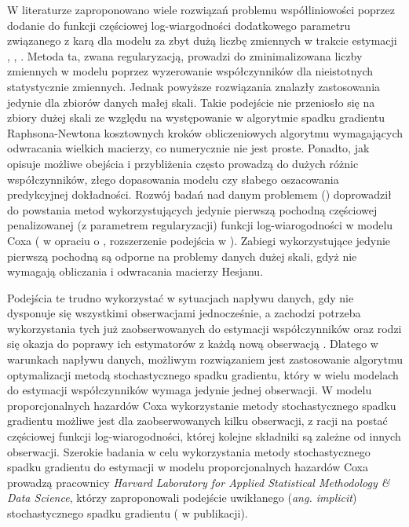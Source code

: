 W literaturze zaproponowano wiele rozwiązań problemu współliniowości poprzez dodanie do funkcji częściowej log-wiargodności dodatkowego parametru związanego z karą dla modelu za zbyt dużą liczbę zmiennych w trakcie estymacji \cite{parkm}, \cite{sohn}, \cite{goemann}. Metoda ta, zwana regularyzacją, prowadzi do zminimalizowana liczby zmiennych w modelu poprzez wyzerowanie współczynników dla nieistotnych statystycznie zmiennych. Jednak powyższe rozwiązania znalazły zastosowania jedynie dla zbiorów danych małej skali. Takie podejście nie przeniosło się na zbiory dużej skali ze względu na występowanie w algorytmie spadku gradientu Raphsona-Newtona kosztownych kroków obliczeniowych algorytmu wymagających odwracania wielkich macierzy, co numerycznie nie jest proste. Ponadto, jak opisuje \cite{mital} możliwe obejścia i przybliżenia często prowadzą do dużych różnic współczynników, złego dopasowania modelu czy słabego oszacowania predykcyjnej dokładności. Rozwój badań nad danym problemem (\cite{KIMKIM}) doprowadził do powstania metod wykorzystujących jedynie pierwszą pochodną częściowej penalizowanej (z parametrem regularyzacji) funkcji log-wiarogodności w modelu Coxa (\cite{sohn} w opraciu o \cite{KIM}, rozszerzenie podejścia w \cite{mital}). Zabiegi wykorzystujące jedynie pierwszą pochodną są odporne na problemy danych dużej skali, gdyż nie wymagają obliczania i odwracania macierzy Hesjanu. 

Podejścia te trudno wykorzystać w sytuacjach napływu danych, gdy nie dysponuje się wszystkimi obserwacjami jednocześnie, a zachodzi potrzeba wykorzystania tych już zaobserwowanych do estymacji współczynników oraz rodzi się okazja do poprawy ich estymatorów z każdą nową obserwacją \cite{bottDOD}. Dlatego w warunkach napływu danych, możliwym rozwiązaniem jest zastosowanie algorytmu optymalizacji metodą stochastycznego spadku gradientu, który w wielu modelach do estymacji współczynników wymaga jedynie jednej obserwacji. W modelu proporcjonalnych hazardów Coxa wykorzystanie metody stochastycznego spadku gradientu możliwe jest dla zaobserwowanych kilku obserwacji, z racji na postać częściowej funkcji log-wiarogodności, której kolejne składniki są zależne od innych obserwacji. Szerokie badania w celu wykorzystania metody stochastycznego spadku gradientu do estymacji w modelu proporcjonalnych hazardów Coxa prowadzą pracownicy \textit{Harvard Laboratory for Applied Statistical Methodology \& Data Science}, którzy zaproponowali podejście uwikłanego (\textit{ang. implicit}) stochastycznego spadku gradientu (\cite{toulis} w publikacji).  

